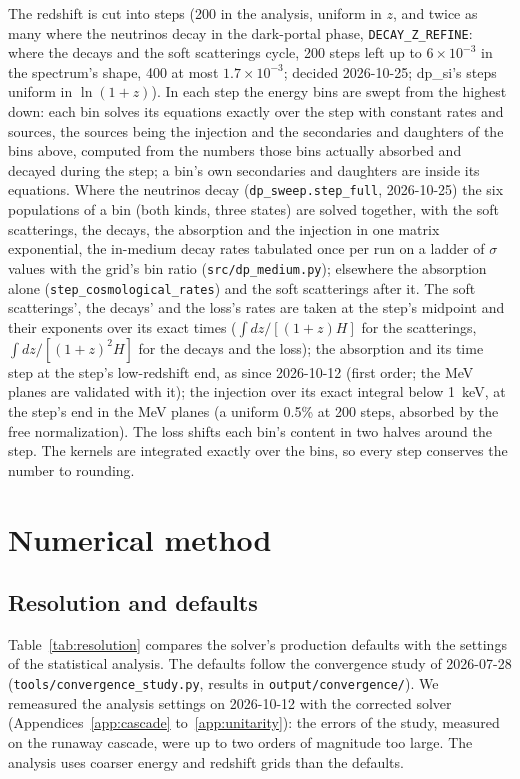 \documentclass[11pt,a4paper]{article}
\newcommand{\file}[1]{\nolinkurl{#1}}
\begin{document}
The redshift is cut into steps (200 in the analysis, uniform in $z$, and twice as many where the neutrinos decay in the dark-portal phase, \texttt{DECAY\_Z\_REFINE}: where the decays and the soft scatterings cycle, 200 steps left up to $6\times10^{-3}$ in the spectrum's shape, 400 at most $1.7\times10^{-3}$; decided 2026-10-25; dp\_si's steps uniform in $\ln(1+z)$). In each step the
energy bins are swept from the highest down: each bin solves its equations exactly over the step with constant rates and
sources, the sources being the injection and the secondaries and daughters of the bins above, computed from the numbers
those bins actually absorbed and decayed during the step; a bin's own secondaries and daughters are inside its equations.
Where the neutrinos decay (\texttt{dp\_sweep.step\_full}, 2026-10-25) the six populations of a bin (both kinds, three
states) are solved together, with the soft scatterings, the decays, the absorption and the injection in one matrix
exponential, the in-medium decay rates tabulated once per run on a ladder of $\sigma$ values with the grid's bin
ratio (\file{src/dp\_medium.py}); elsewhere the absorption alone (\texttt{step\_cosmological\_rates}) and the soft
scatterings after it. The soft scatterings', the decays' and the loss's rates are taken at the step's midpoint and their
exponents over its exact times ($\int dz/[(1+z)H]$ for the scatterings, $\int dz/[(1+z)^2H]$ for the decays and the
loss); the absorption and its time step at the step's low-redshift end, as since 2026-10-12 (first order; the MeV planes
are validated with it); the injection over its exact integral below 1~keV, at the step's end in the MeV planes (a uniform
0.5\% at 200 steps, absorbed by the free normalization). The loss shifts each bin's content in two halves around the step.
The kernels are integrated exactly over the bins, so every step conserves the number to rounding.

\section{Numerical method}
\label{sec:numerics}

\subsection{Resolution and defaults}

Table~\ref{tab:resolution} compares the solver's production defaults with the settings of the
statistical analysis. The defaults follow the convergence study of 2026-07-28
(\file{tools/convergence_study.py}, results in \file{output/convergence/}). We remeasured the
analysis settings on 2026-10-12 with the corrected solver (Appendices~\ref{app:cascade}
to~\ref{app:unitarity}): the errors of the study, measured on the runaway cascade, were up to
two orders of magnitude too large. The analysis uses coarser energy and redshift grids than the
defaults.
\end{document}
